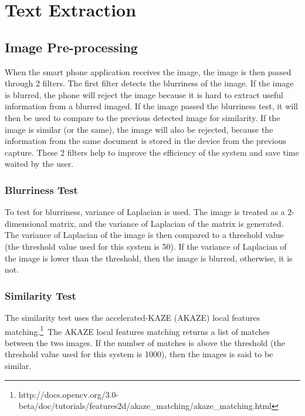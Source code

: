 \section{Text Extraction}

\subsection{Image Pre-processing}
When the smart phone application receives the image, the image is then passed through 2 filters. The first filter detects the blurriness of the image. If the image is blurred, the phone will reject the image because it is hard to extract useful information from a blurred imaged. If the image passed the blurriness test, it will then be used to compare to the previous detected image for similarity. If the image is similar (or the same), the image will also be rejected, because the information from the same document is stored in the device from the previous capture. These 2 filters help to improve the efficiency of the system and save time waited by the user.

\subsubsection{Blurriness Test}
To test for blurriness, variance of Laplacian is used. The image is treated as a 2-dimensional matrix, and the variance of Laplacian of the matrix is generated. The variance of Laplacian of the image is then compared to a threshold value (the threshold value used for this system is 50). If the variance of Laplacian of the image is lower than the threshold, then the image is blurred, otherwise, it is not.

\subsubsection{Similarity Test}
The similarity test uses the accelerated-KAZE (AKAZE) local features matching.\footnote{http://docs.opencv.org/3.0-beta/doc/tutorials/features2d/akaze\_matching/akaze\_matching.html}~The AKAZE local features matching returns a list of matches between the two images. If the number of matches is above the threshold (the threshold value used for this system is 1000), then the images is said to be similar.

